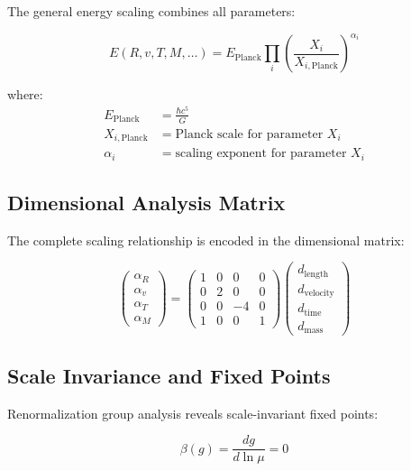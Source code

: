 \documentclass[12pt,a4paper]{article}
\begin{document}
The general energy scaling combines all parameters:

\begin{equation}
E(R, v, T, M, \ldots) = E_{\text{Planck}} \prod_{i} \left(\frac{X_i}{X_{i,\text{Planck}}}\right)^{\alpha_i}
\end{equation}

where:
\begin{align}
E_{\text{Planck}} &= \frac{\hbar c^5}{G} \\
X_{i,\text{Planck}} &= \text{Planck scale for parameter } X_i \\
\alpha_i &= \text{scaling exponent for parameter } X_i
\end{align}

\subsection{Dimensional Analysis Matrix}

The complete scaling relationship is encoded in the dimensional matrix:

\begin{equation}
\begin{pmatrix}
\alpha_R \\
\alpha_v \\
\alpha_T \\
\alpha_M
\end{pmatrix} = 
\begin{pmatrix}
1 & 0 & 0 & 0 \\
0 & 2 & 0 & 0 \\
0 & 0 & -4 & 0 \\
1 & 0 & 0 & 1
\end{pmatrix}
\begin{pmatrix}
d_{\text{length}} \\
d_{\text{velocity}} \\
d_{\text{time}} \\
d_{\text{mass}}
\end{pmatrix}
\end{equation}

\subsection{Scale Invariance and Fixed Points}

Renormalization group analysis reveals scale-invariant fixed points:

\begin{equation}
\beta(g) = \frac{dg}{d\ln\mu} = 0
\end{equation}
\end{document}
